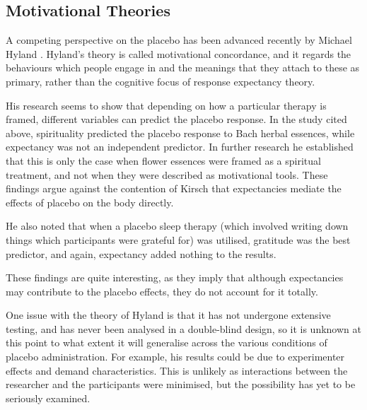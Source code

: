 \subsection{Motivational Theories}
\label{sec:behav-plac-motiv}

A competing perspective on the placebo has been advanced recently by Michael Hyland \cite{Hyland2006}. Hyland's theory is called motivational concordance, and it regards the behaviours which people engage in and the meanings that they attach to these as primary,  rather than the cognitive focus of response expectancy theory.  

His research seems to show that depending on how a particular therapy is framed, different variables can predict the placebo response.  In the study cited above, spirituality predicted the placebo response to Bach herbal essences, while expectancy was not an independent predictor. In further research \cite{Hyland2007} he established that this is only the case when flower essences were framed as a spiritual treatment, and not when they were described as motivational tools. These findings argue against the contention of Kirsch that expectancies mediate the effects of placebo on the body directly. 

He also noted that when a placebo sleep therapy (which involved writing down things which participants were grateful for) was utilised, gratitude was the best predictor, and again, expectancy added nothing to the results. 

These findings are quite interesting, as they imply that although expectancies may contribute to the placebo effects, they do not account for it totally. 



One issue with the theory of Hyland is that it has not undergone extensive testing, and has never been analysed in a double-blind design, so it is unknown at this point to what extent it will generalise across the various conditions of placebo administration. For example, his results could be due to experimenter effects and demand characteristics. This is  unlikely as interactions between the researcher and the participants were minimised, but the possibility has yet to be seriously examined. 

